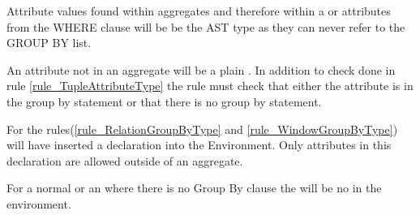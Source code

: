 Attribute values found within aggregates and therefore within a  or attributes from the WHERE clause will be be the AST type  as they can never refer to the GROUP BY list.

An attribute not in an aggregate will be a plain . 
In addition to check done in rule \ref{rule_TupleAttributeType} the rule must check that either the attribute is in the group by statement or that there is no group by statement.

For  the rules(\ref{rule_RelationGroupByType} and \ref{rule_WindowGroupByType}) will have inserted a  declaration into the Environment. 
Only attributes in this declaration are allowed outside of an aggregate.


For a normal  or an  where there is no Group By clause the will be no  in the environment. 


